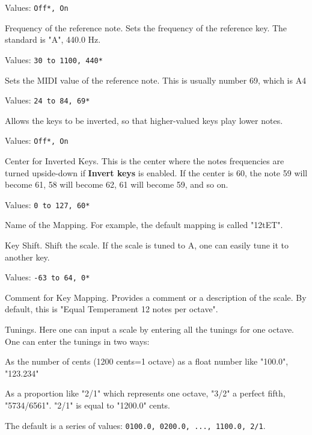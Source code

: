    Values: \texttt{Off*, On}

   Frequency of the reference note.
   Sets the frequency of the reference key. The standard is "A", 440.0 Hz.

   Values: \texttt{30 to 1100, 440*}

   Sets the MIDI value of the reference note. This is usually number 69,
   which is A4

   Values: \texttt{24 to 84, 69*}

   Allows the keys to be inverted, so that higher-valued keys play lower
   notes.

   Values: \texttt{Off*, On}

   Center for Inverted Keys.
   This is the center where the notes frequencies are turned upside-down if
   \textbf{Invert keys} is enabled.
   If the center is 60, the note 59 will become 61, 58 will become 62, 61
   will become 59, and so on.

   Values: \texttt{0 to 127, 60*}

   Name of the Mapping.
   For example, the default mapping is called "12tET".

   Key Shift.
   Shift the scale. If the scale is tuned to A, one can easily tune it to
   another key.

   Values: \texttt{-63 to 64, 0*}

   Comment for Key Mapping.
   Provides a comment or a description of the scale.
   By default, this is "Equal Temperament 12 notes per octave".

   Tunings.
   Here one can input a scale by entering all the tunings for one octave.
One can enter the tunings in two ways:

   \begin{enumber}
      \item As the number of cents (1200 cents=1 octave) as a float number
         like "100.0", "123.234"
      \item As a proportion like "2/1" which represents one octave, "3/2" a
         perfect fifth, "5734/6561".  "2/1" is equal to "1200.0" cents.
   \end{enumber}

   The default is a series of values:
   \texttt{0100.0, 0200.0, ..., 1100.0, 2/1}.

